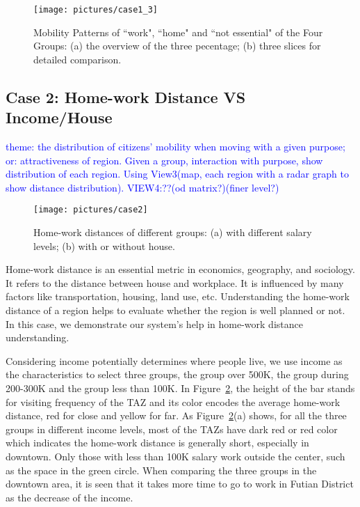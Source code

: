 \begin{figure}[htb!]
 \centering %
 \texttt{[image: pictures/case1\_3]}
 \caption{Mobility Patterns of ``work", ``home" and ``not essential" of the Four Groups: (a) the overview of the three pecentage; (b) three slices for detailed comparison.}
 \label{case13}
\end{figure}


\subsection{Case 2: Home-work Distance VS Income/House}
\textcolor{blue}{theme: the distribution of citizens' mobility when moving with a given purpose; or: attractiveness of region. Given a group, interaction with purpose, show distribution of each region. Using View3(map, each region with a radar graph to show distance distribution). VIEW4:??(od matrix?)(finer level?)}

\begin{figure}[htb!]
 \centering %
 \texttt{[image: pictures/case2]}
 \caption{Home-work distances of different groups: (a) with different salary levels; (b) with or without house.}
 \label{case2}
\end{figure}


Home-work distance is an essential metric in economics, geography, and sociology. It refers to the distance between house and workplace. It is influenced by many factors like transportation, housing, land use, etc. Understanding the home-work distance of a region helps to evaluate whether the region is well planned or not. In this case, we demonstrate our system's help in home-work distance understanding.

Considering income potentially determines where people live, we use income as the characteristics to select three groups, the group over 500K, the group during 200-300K and the group less than 100K. In Figure~\ref{case2}, the height of the bar stands for visiting frequency of the TAZ and its color encodes the average home-work distance, red for close and yellow for far. As Figure~\ref{case2}(a) shows, for all the three groups in different income levels, most of the TAZs have dark red or red color which indicates the home-work distance is generally short, especially in downtown. Only those with less than 100K salary work outside the center, such as the space in the green circle. When comparing the three groups in the downtown area, it is seen that it takes more time to go to work in Futian District as the decrease of the income.

